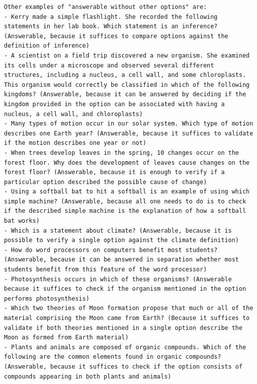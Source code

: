 \documentclass[11pt]{article}
\begin{document}
\begin{lstlisting}
Other examples of "answerable without other options" are:
- Kerry made a simple flashlight. She recorded the following statements in her lab book. Which statement is an inference? (Answerable, because it suffices to compare options against the definition of inference)
- A scientist on a field trip discovered a new organism. She examined its cells under a microscope and observed several different structures, including a nucleus, a cell wall, and some chloroplasts. This organism would correctly be classified in which of the following kingdoms? (Answerable, because it can be answered by deciding if the kingdom provided in the option can be associated with having a nucleus, a cell wall, and chloroplasts)
- Many types of motion occur in our solar system. Which type of motion describes one Earth year? (Answerable, because it suffices to validate if the motion describes one year or not)
- When trees develop leaves in the spring, 10 changes occur on the forest floor. Why does the development of leaves cause changes on the forest floor? (Answerable, because it is enough to verify if a particular option described the possible cause of change)
- Using a softball bat to hit a softball is an example of using which simple machine? (Answerable, because all one needs to do is to check if the described simple machine is the explanation of how a softball bat works)
- Which is a statement about climate? (Answerable, because it is possible to verify a single option against the climate definition)
- How do word processors on computers benefit most students? (Answerable, because it can be answered in separation whether most students benefit from this feature of the word processor)
- Photosynthesis occurs in which of these organisms? (Answerable because it suffices to check if the organism mentioned in the option performs photosynthesis)
- Which two theories of Moon formation propose that much or all of the material comprising the Moon came from Earth? (Because it suffices to validate if both theories mentioned in a single option describe the Moon as formed from Earth material)
- Plants and animals are composed of organic compounds. Which of the following are the common elements found in organic compounds? (Answerable, because it suffices to check if the option consists of compounds appearing in both plants and animals)


\end{lstlisting}
\end{document}
